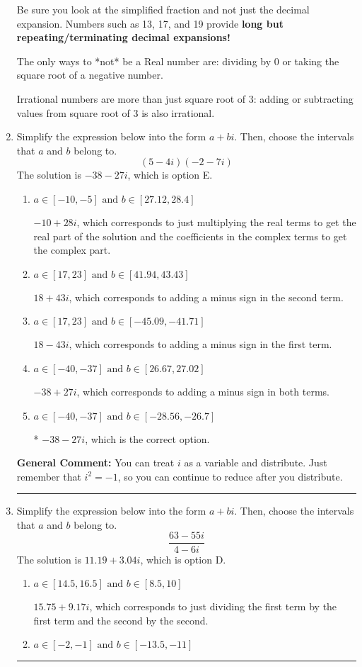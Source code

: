 \documentclass{extbook}[14pt]
\newcommand{\litem}[1]{\item #1

\rule{\textwidth}{0.4pt}}
\begin{document}
\begin{enumerate}
{ Be sure you look at the simplified fraction and not just the decimal expansion. Numbers such as 13, 17, and 19 provide \textbf{long but repeating/terminating decimal expansions!} 
 
 The only ways to *not* be a Real number are: dividing by 0 or taking the square root of a negative number. 
 
 Irrational numbers are more than just square root of 3: adding or subtracting values from square root of 3 is also irrational.
}
\litem{
Simplify the expression below into the form $a+bi$. Then, choose the intervals that $a$ and $b$ belong to.
\[ (5 - 4 i)(-2 - 7 i) \]The solution is \( -38 - 27 i \), which is option E.\begin{enumerate}[label=\Alph*.]
\item \( a \in [-10, -5] \text{ and } b \in [27.12, 28.4] \)

 $-10 + 28 i$, which corresponds to just multiplying the real terms to get the real part of the solution and the coefficients in the complex terms to get the complex part.
\item \( a \in [17, 23] \text{ and } b \in [41.94, 43.43] \)

 $18 + 43 i$, which corresponds to adding a minus sign in the second term.
\item \( a \in [17, 23] \text{ and } b \in [-45.09, -41.71] \)

 $18 - 43 i$, which corresponds to adding a minus sign in the first term.
\item \( a \in [-40, -37] \text{ and } b \in [26.67, 27.02] \)

 $-38 + 27 i$, which corresponds to adding a minus sign in both terms.
\item \( a \in [-40, -37] \text{ and } b \in [-28.56, -26.7] \)

* $-38 - 27 i$, which is the correct option.
\end{enumerate}

\textbf{General Comment:} You can treat $i$ as a variable and distribute. Just remember that $i^2=-1$, so you can continue to reduce after you distribute.
}
\litem{
Simplify the expression below into the form $a+bi$. Then, choose the intervals that $a$ and $b$ belong to.
\[ \frac{63 - 55 i}{4 - 6 i} \]The solution is \( 11.19  + 3.04 i \), which is option D.\begin{enumerate}[label=\Alph*.]
\item \( a \in [14.5, 16.5] \text{ and } b \in [8.5, 10] \)

 $15.75  + 9.17 i$, which corresponds to just dividing the first term by the first term and the second by the second.
\item \( a \in [-2, -1] \text{ and } b \in [-13.5, -11] \)


\end{enumerate}}
\end{enumerate}
\end{document}
